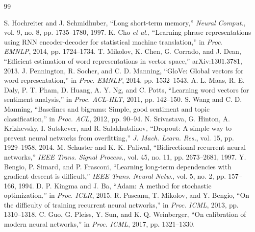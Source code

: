 \documentclass[letterpaper, 10 pt, conference]{ieeeconf}
\begin{document}
\begin{thebibliography}{99}

 S. Hochreiter and J. Schmidhuber, ``Long short-term memory,'' \textit{Neural Comput.}, vol. 9, no. 8, pp. 1735--1780, 1997.
 K. Cho \textit{et al.}, ``Learning phrase representations using RNN encoder-decoder for statistical machine translation,'' in \textit{Proc. EMNLP}, 2014, pp. 1724--1734.
 T. Mikolov, K. Chen, G. Corrado, and J. Dean, ``Efficient estimation of word representations in vector space,'' arXiv:1301.3781, 2013.
 J. Pennington, R. Socher, and C. D. Manning, ``GloVe: Global vectors for word representation,'' in \textit{Proc. EMNLP}, 2014, pp. 1532--1543.
 A. L. Maas, R. E. Daly, P. T. Pham, D. Huang, A. Y. Ng, and C. Potts, ``Learning word vectors for sentiment analysis,'' in \textit{Proc. ACL-HLT}, 2011, pp. 142--150.
 S. Wang and C. D. Manning, ``Baselines and bigrams: Simple, good sentiment and topic classification,'' in \textit{Proc. ACL}, 2012, pp. 90--94.
 N. Srivastava, G. Hinton, A. Krizhevsky, I. Sutskever, and R. Salakhutdinov, ``Dropout: A simple way to prevent neural networks from overfitting,'' \textit{J. Mach. Learn. Res.}, vol. 15, pp. 1929--1958, 2014.
 M. Schuster and K. K. Paliwal, ``Bidirectional recurrent neural networks,'' \textit{IEEE Trans. Signal Process.}, vol. 45, no. 11, pp. 2673--2681, 1997.
 Y. Bengio, P. Simard, and P. Frasconi, ``Learning long-term dependencies with gradient descent is difficult,'' \textit{IEEE Trans. Neural Netw.}, vol. 5, no. 2, pp. 157--166, 1994.
 D. P. Kingma and J. Ba, ``Adam: A method for stochastic optimization,'' in \textit{Proc. ICLR}, 2015.
 R. Pascanu, T. Mikolov, and Y. Bengio, ``On the difficulty of training recurrent neural networks,'' in \textit{Proc. ICML}, 2013, pp. 1310--1318.
 C. Guo, G. Pleiss, Y. Sun, and K. Q. Weinberger, ``On calibration of modern neural networks,'' in \textit{Proc. ICML}, 2017, pp. 1321--1330.

\end{thebibliography}
\end{document}
